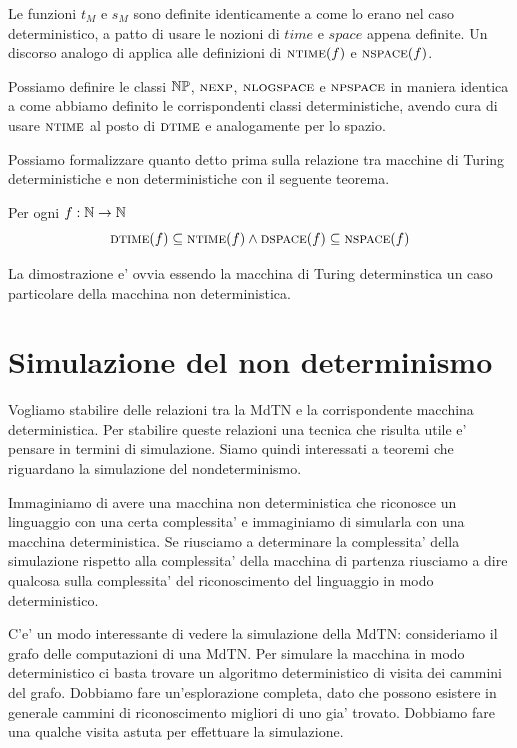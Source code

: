 Le funzioni $t_{M}$ e $s_{M}$ sono definite identicamente a come lo erano nel caso deterministico, a
patto di usare le nozioni di $\textit{time}$ e $\textit{space}$ appena definite. Un discorso analogo
di applica alle definizioni di $\textsc{ntime}(f)$ e $\textsc{nspace}(f)$.

Possiamo definire le classi $\mathbb{NP}$, $\textsc{nexp}$, $\textsc{nlogspace}$ e $\textsc{npspace}$ in maniera identica a
come abbiamo definito le corrispondenti classi deterministiche, avendo cura di usare $\textsc{ntime}$ al
posto di $\textsc{dtime}$ e analogamente per lo spazio.

Possiamo formalizzare quanto detto prima sulla relazione tra macchine di Turing deterministiche e
non deterministiche con il seguente teorema.
\begin{thm}
    Per ogni $f: \mathbb{N} \to \mathbb{N}$
    \begin{equation*}
        \textsc{dtime}(f) \subseteq \textsc{ntime}(f) \land \textsc{dspace}(f) \subseteq \textsc{nspace}(f)
    \end{equation*}
\end{thm}
La dimostrazione e' ovvia essendo la macchina di Turing determinstica un caso particolare della
macchina non deterministica.


\section{Simulazione del non determinismo}

Vogliamo stabilire delle relazioni tra la MdTN e la corrispondente macchina deterministica. Per
stabilire queste relazioni una tecnica che risulta utile e' pensare in termini di simulazione.
Siamo quindi interessati a teoremi che riguardano la simulazione del nondeterminismo.

Immaginiamo di avere una macchina non deterministica che riconosce un linguaggio con una certa
complessita' e immaginiamo di simularla con una macchina deterministica. Se riusciamo a determinare
la complessita' della simulazione rispetto alla complessita' della macchina di partenza riusciamo a
dire qualcosa sulla complessita' del riconoscimento del linguaggio in modo deterministico.

C'e' un modo interessante di vedere la simulazione della MdTN: consideriamo il grafo delle
computazioni di una MdTN. Per simulare la macchina in modo deterministico ci basta trovare un
algoritmo deterministico di visita dei cammini del grafo. Dobbiamo fare un'esplorazione completa,
dato che possono esistere in generale cammini di riconoscimento migliori di uno gia' trovato.
Dobbiamo fare una qualche visita astuta per effettuare la simulazione.


